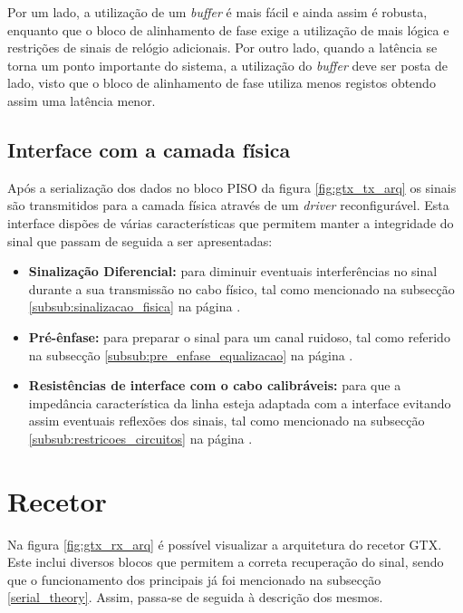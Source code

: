 Por um lado, a utilização de um \textit{buffer} é mais fácil e ainda assim é robusta, enquanto que o bloco de alinhamento de fase exige a utilização de mais lógica e restrições de sinais de relógio adicionais. Por outro lado, quando a latência se torna um ponto importante do sistema, a utilização do \textit{buffer} deve ser posta de lado, visto que o bloco de alinhamento de fase utiliza menos registos obtendo assim uma latência menor.

\subsection{Interface com a camada física} 
Após a serialização dos dados no bloco PISO da figura \ref{fig:gtx_tx_arq} os sinais são transmitidos para a camada física através de um \textit{driver} reconfigurável. Esta interface dispões de várias características que permitem manter a integridade do sinal que passam de seguida a ser apresentadas:

\begin{itemize}
	\item \textbf{Sinalização Diferencial:} para diminuir eventuais interferências no sinal durante a sua transmissão no cabo físico, tal como mencionado na subsecção  \ref{subsub:sinalizacao_fisica} na página \pageref{subsub:sinalizacao_fisica}.
	
	\item \textbf{Pré-ênfase:} para preparar o sinal para um canal ruidoso, tal como referido na subsecção \ref{subsub:pre_enfase_equalizacao} na página \pageref{subsub:pre_enfase_equalizacao}.
	
	\item \textbf{Resistências de interface com o cabo calibráveis:} para que a impedância característica da linha esteja adaptada com a interface evitando assim eventuais reflexões dos sinais, tal como mencionado na subsecção \ref{subsub:restricoes_circuitos} na página \pageref{subsub:restricoes_circuitos}.
\end{itemize}


\section{Recetor} \label{sec:_rx_gtx}
Na figura \ref{fig:gtx_rx_arq} é possível visualizar a arquitetura do recetor GTX. Este inclui diversos blocos que permitem a correta recuperação do sinal, sendo que o funcionamento dos principais já foi mencionado na subsecção \ref{serial_theory}. Assim, passa-se de seguida à descrição dos mesmos.

